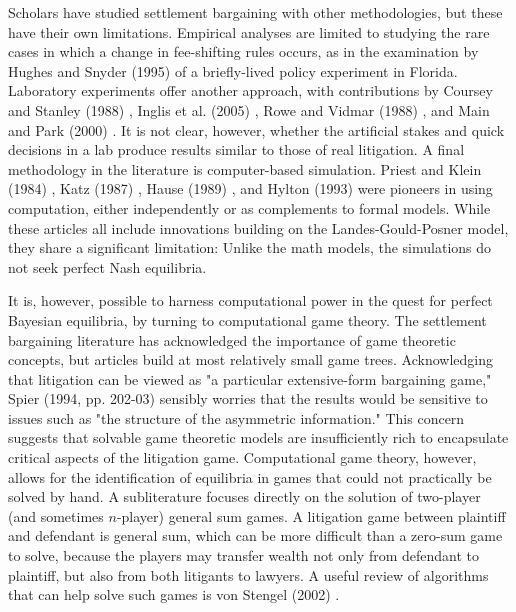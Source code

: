 \documentclass{article}
\begin{document}
Scholars have studied settlement bargaining with other methodologies, but these have their own limitations. Empirical analyses are limited to studying the rare cases in which a change in fee-shifting rules occurs, as in the examination by Hughes and Snyder (1995) \cite{hughessnyder} of a briefly-lived policy experiment in Florida. Laboratory experiments offer another approach, with contributions by Coursey and Stanley (1988) \cite{courseystanley}, Inglis et al. (2005) \cite{inglisetal},  Rowe and Vidmar (1988) \cite{rowevidmar}, and Main and Park (2000) \cite{mainpark}. It is not clear, however, whether the artificial stakes and quick decisions in a lab produce results similar to those of real litigation. A final methodology in the literature is computer-based simulation. Priest and Klein (1984) \cite{priestklein}, Katz (1987) \cite{katz}, Hause (1989) \cite{hause}, and Hylton (1993) \cite{hylton} were pioneers in using computation, either independently or as complements to formal models. While these articles all include innovations building on the Landes-Gould-Posner model, they share a significant limitation: Unlike the math models, the simulations do not seek perfect Nash equilibria.

It is, however, possible to harness computational power in the quest for perfect Bayesian equilibria, by turning to computational game theory. The settlement bargaining literature has acknowledged the importance of game theoretic concepts, but articles build at most relatively small game trees. Acknowledging that litigation can be viewed as "a particular extensive-form bargaining game," Spier (1994, pp. 202-03) \cite{spier} sensibly worries that the results would be sensitive to issues such as "the structure of the asymmetric information." This concern suggests that solvable game theoretic models are insufficiently rich to encapsulate critical aspects of the litigation game. Computational game theory, however, allows for the identification of equilibria in games that could not practically be solved by hand. A subliterature focuses directly on the solution of two-player (and sometimes $n$-player) general sum games. A litigation game between plaintiff and defendant is general sum, which can be more difficult than a zero-sum game to solve, because the players may transfer wealth not only from defendant to plaintiff, but also from both litigants to lawyers. A useful review of algorithms that can help solve such games is von Stengel (2002) \cite{vonstengel2002}.
\end{document}
